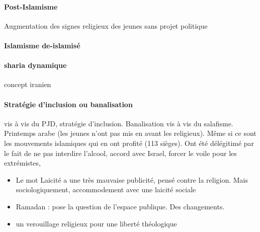 \paragraph{Post-Islamisme} Augmentation des signes religieux des jeunes sans projet politique

\paragraph{Islamisme de-islamisé}

\paragraph{sharia dynamique} concept iranien


\paragraph{Stratégie d'inclusion ou banalisation} vis à vis du PJD, stratégie d'inclusion. Banalisation vis à vis du salafisme. Printemps arabe (les jeunes n'ont pas mis en avant les religieux). Même si ce sont les mouvements islamiques qui en ont profité (113 sièges). Ont été délégitimé par le fait de ne pas interdire l'alcool, accord avec Israel, forcer le voile pour les extrémistes, 

\begin{Synthesis}
    \begin{itemize}
        \item Le mot Laicité a une très mauvaise publicité, pensé contre la religion. Mais sociologiquement, accommodement avec une laicité sociale
        \item  Ramadan : pose la question de l'espace publique. Des changements.
        \item un verouillage religieux pour une liberté théologique
    \end{itemize}
\end{Synthesis}

